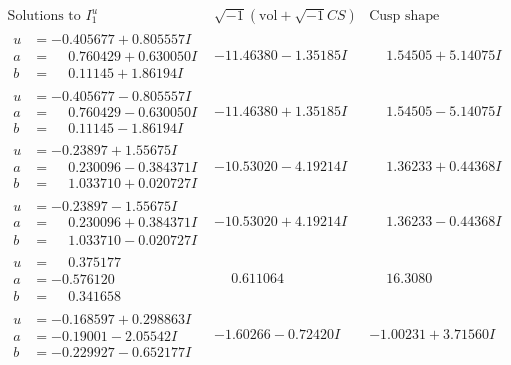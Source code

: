 \documentclass[1p]{elsarticle_modified}
\theoremstyle{definition}
\newcommand{\I}{\sqrt{-1}}
\begin{document}
$$\begin{array}{c|c|c}  
\text{Solutions to }I^u_{1}& \I (\text{vol} + \sqrt{-1}CS) & \text{Cusp shape}\\
 \hline 
\begin{aligned}
u &= -0.405677 + 0.805557 I \\
a &= \phantom{-}0.760429 + 0.630050 I \\
b &= \phantom{-}0.11145 + 1.86194 I\end{aligned}
 & -11.46380 - 1.35185 I & \phantom{-}1.54505 + 5.14075 I \\ \hline\begin{aligned}
u &= -0.405677 - 0.805557 I \\
a &= \phantom{-}0.760429 - 0.630050 I \\
b &= \phantom{-}0.11145 - 1.86194 I\end{aligned}
 & -11.46380 + 1.35185 I & \phantom{-}1.54505 - 5.14075 I \\ \hline\begin{aligned}
u &= -0.23897 + 1.55675 I \\
a &= \phantom{-}0.230096 - 0.384371 I \\
b &= \phantom{-}1.033710 + 0.020727 I\end{aligned}
 & -10.53020 - 4.19214 I & \phantom{-}1.36233 + 0.44368 I \\ \hline\begin{aligned}
u &= -0.23897 - 1.55675 I \\
a &= \phantom{-}0.230096 + 0.384371 I \\
b &= \phantom{-}1.033710 - 0.020727 I\end{aligned}
 & -10.53020 + 4.19214 I & \phantom{-}1.36233 - 0.44368 I \\ \hline\begin{aligned}
u &= \phantom{-}0.375177\phantom{ +0.000000I} \\
a &= -0.576120\phantom{ +0.000000I} \\
b &= \phantom{-}0.341658\phantom{ +0.000000I}\end{aligned}
 & \phantom{-}0.611064\phantom{ +0.000000I} & \phantom{-}16.3080\phantom{ +0.000000I} \\ \hline\begin{aligned}
u &= -0.168597 + 0.298863 I \\
a &= -0.19001 - 2.05542 I \\
b &= -0.229927 - 0.652177 I\end{aligned}
 & -1.60266 - 0.72420 I & -1.00231 + 3.71560 I \\ \hline\begin{aligned}

\end{aligned}
\end{array}$$
\end{document}
